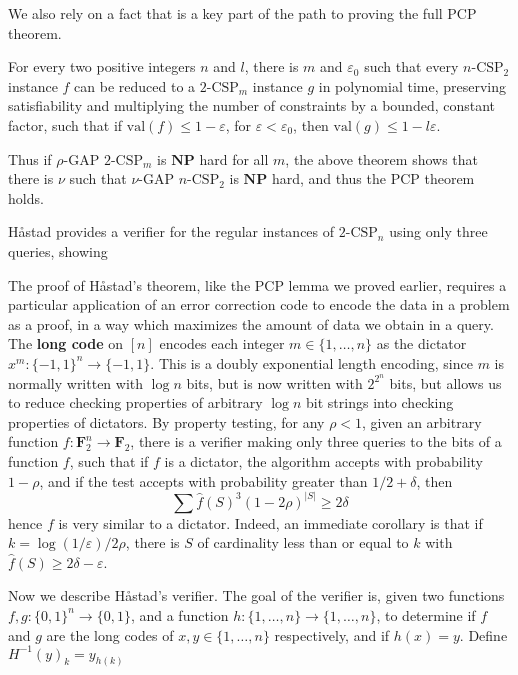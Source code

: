 We also rely on a fact that is a key part of the path to proving the full PCP theorem.

\begin{theorem}
    For every two positive integers $n$ and $l$, there is $m$ and $\varepsilon_0$ such that every $n\text{-CSP}_2$ instance $f$ can be reduced to a $2\text{-CSP}_m$ instance $g$ in polynomial time, preserving satisfiability and multiplying the number of constraints by a bounded, constant factor, such that if $\text{val}(f) \leq 1 - \varepsilon$, for $\varepsilon < \varepsilon_0$, then $\text{val}(g) \leq 1 - l\varepsilon$.
\end{theorem}

Thus if $\rho$-GAP $2\text{-CSP}_m$ is $\mathbf{NP}$ hard for all $m$, the above theorem shows that there is $\nu$ such that $\nu$-GAP $n\text{-CSP}_2$ is $\mathbf{NP}$ hard, and thus the PCP theorem holds.

Håstad provides a verifier for the regular instances of $2\text{-CSP}_n$ using only three queries, showing 

The proof of Håstad's theorem, like the PCP lemma we proved earlier, requires a particular application of an error correction code to encode the data in a problem as a proof, in a way which maximizes the amount of data we obtain in a query. The {\bf long code} on $[n]$ encodes each integer $m \in \{ 1, \dots, n \}$ as the dictator $x^m: \{ -1, 1 \}^n \to \{ -1, 1 \}$. This is a doubly exponential length encoding, since $m$ is normally written with $\log n$ bits, but is now written with $2^{2^n}$ bits, but allows us to reduce checking properties of arbitrary $\log n$ bit strings into checking properties of dictators. By property testing, for any $\rho < 1$, given an arbitrary function $f: \mathbf{F}_2^n \to \mathbf{F}_2$, there is a verifier making only three queries to the bits of a function $f$, such that if $f$ is a dictator, the algorithm accepts with probability $1 - \rho$, and if the test accepts with probability greater than $1/2 + \delta$, then
%
\[ \sum \widehat{f}(S)^3 (1 - 2 \rho)^{|S|} \geq 2 \delta \]
%
hence $f$ is very similar to a dictator. Indeed, an immediate corollary is that if $k = \log(1/\varepsilon) /2\rho$, there is $S$ of cardinality less than or equal to $k$ with $\widehat{f}(S) \geq 2\delta - \varepsilon$.

Now we describe Håstad's verifier. The goal of the verifier is, given two functions $f,g: \{ 0, 1 \}^n \to \{ 0,1 \}$, and a function $h: \{ 1, \dots, n \} \to \{ 1, \dots, n \}$, to determine if $f$ and $g$ are the long codes of $x,y \in \{ 1, \dots, n \}$ respectively, and if $h(x) = y$. Define $H^{-1}(y)_k = y_{h(k)}$


